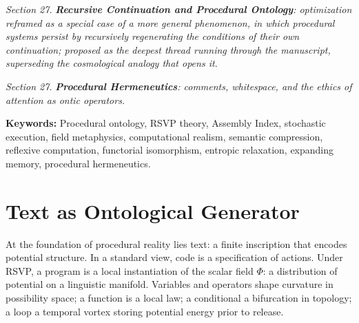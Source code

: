 \documentclass[12pt,a4paper]{article}
\theoremstyle{plain}
\theoremstyle{definition}
\theoremstyle{remark}
\newcommand{\Phifield}{\Phi}
\newcommand{\vfield}{\mathcal{v}}
\newcommand{\Sfield}{S}
\begin{document}
\textit{Section 27.} \textit{\textbf{Recursive Continuation and Procedural Ontology}: optimization reframed as a special case of a more general phenomenon, in which procedural systems persist by recursively regenerating the conditions of their own continuation; proposed as the deepest thread running through the manuscript, superseding the cosmological analogy that opens it.}

\textit{Section 27.} \textit{\textbf{Procedural Hermeneutics}: comments, whitespace, and the ethics of attention as ontic operators.}

\newpage
\tableofcontents
\newpage

\begin{abstract}
This essay advances a rigorous metaphysics of generative computation within the Relativistic Scalar–Vector Plenum (RSVP) framework. We model code execution as microcosmic cosmogenesis: text as scalar potential $\Phifield$, execution as stochastic vector flow $\vfield$, and rendering as entropic diffusion $\Sfield$. Formal field definitions, stochastic differential equations, Assembly Theory, functorial mappings, and editor–terminal practice are unified to demonstrate structural isomorphisms with physical law. We argue that executable text is a local plenum: a finite law whose repeated execution constitutes entropic relaxation toward visible form. We include empirical predictions, dimensional consistency checks, and philosophical defenses, and we extend the theory with \emph{expanding memory} strategies (vim/byobu ecologies, reversible erasure, and literate operations). The goal is not analogy but operational homology: procedures as enactments of law in both computing and cosmos.
\end{abstract}

\textbf{Keywords:} Procedural ontology, RSVP theory, Assembly Index, stochastic execution, field metaphysics, computational realism, semantic compression, reflexive computation, functorial isomorphism, entropic relaxation, expanding memory, procedural hermeneutics.

\section{Text as Ontological Generator}
\label{sec:text-generator}

At the foundation of procedural reality lies text: a finite inscription that encodes potential structure. In a standard view, code is a specification of actions. Under RSVP, a program is a local instantiation of the scalar field $\Phifield$: a distribution of potential on a linguistic manifold. Variables and operators shape curvature in possibility space; a function is a local law; a conditional a bifurcation in topology; a loop a temporal vortex storing potential energy prior to release.
\end{document}
